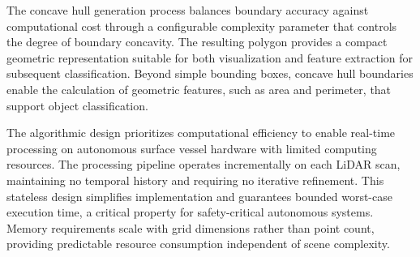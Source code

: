 \documentclass{erauthesis}
\begin{document}
The concave hull generation process balances boundary accuracy against computational cost through a configurable complexity parameter that controls the degree of boundary concavity. 
The resulting polygon provides a compact geometric representation suitable for both visualization and feature extraction for subsequent classification. 
Beyond simple bounding boxes, concave hull boundaries enable the calculation of geometric features, such as area and perimeter, that support object classification. 

The algorithmic design prioritizes computational efficiency to enable real-time processing on autonomous surface vessel hardware with limited computing resources. 
The processing pipeline operates incrementally on each LiDAR scan, maintaining no temporal history and requiring no iterative refinement. 
This stateless design simplifies implementation and guarantees bounded worst-case execution time, a critical property for safety-critical autonomous systems. 
Memory requirements scale with grid dimensions rather than point count, providing predictable resource consumption independent of scene complexity.







\end{document}
